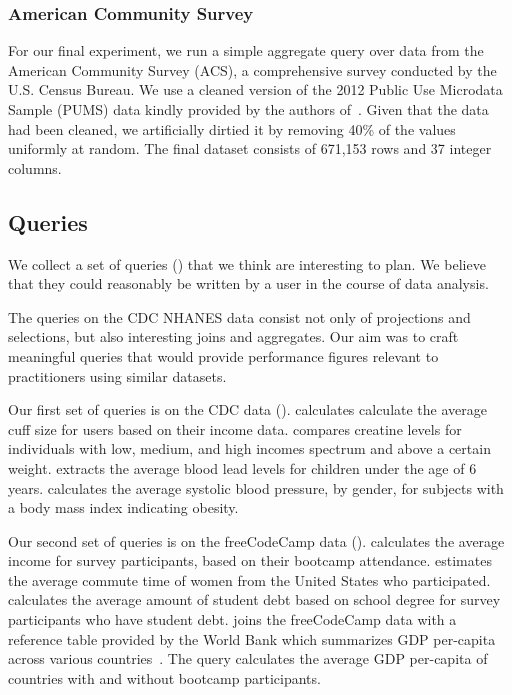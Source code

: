 \subsubsection{American Community Survey}
For our final experiment, we run a simple aggregate query over data from the American
Community Survey (ACS), a comprehensive survey conducted by the U.S.
Census Bureau. We use a cleaned version of the 2012 Public Use Microdata Sample (PUMS)
data kindly provided by the authors of~\cite{akande2015empirical}. Given that the data had
been cleaned, we artificially dirtied it by removing 40\% of the values uniformly at random.
The final dataset consists of 671,153 rows and 37 integer columns.

\subsection{Queries}
We collect a set of queries () that we think are interesting to plan.
We believe that they could reasonably be written by a user in the course of data analysis.

The queries on the CDC NHANES data consist not only of projections and selections, but also
interesting joins and aggregates.  Our aim was to craft meaningful queries that would
provide performance figures relevant to practitioners using similar datasets.

Our first set of queries is on the CDC data ().
 calculates calculate the average cuff size for users based on their income data.
 compares creatine levels for individuals with low, medium, and high incomes spectrum and above a certain weight.
 extracts the average blood lead levels for children under the age of 6 years.
 calculates the average systolic blood pressure, by gender, for subjects with a body mass index indicating obesity. 

Our second set of queries is on the freeCodeCamp data ().
 calculates the average income for survey participants, based on their bootcamp attendance.
 estimates the average commute time of women from the United States who participated.
 calculates the average amount of student debt based on school degree for survey participants who have student debt.
 joins the freeCodeCamp data with a reference table provided by the World Bank which summarizes GDP per-capita across various countries~\cite{worldbank-data}.
The query calculates the average GDP per-capita of countries with and without bootcamp participants. 

